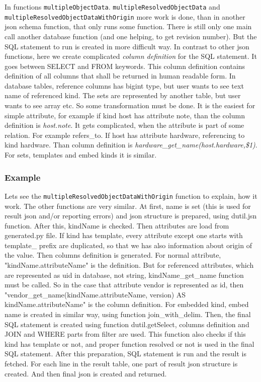 \documentclass[deska]{subfiles}
\begin{document}
In functions {\tt multipleObjectData}. {\tt multipleResolvedObjectData} and {\tt multipleResolvedObjectDataWithOrigin}
more work is done, than in another json schema function, that only runs some function.
There is still only one main call another database function (and one helping, to get revision number).
But the SQL statement to run is created in more difficult way. In contrast to other json functions,
here we create complicated {\em column definition} for the SQL statement. It goes between SELECT and FROM keywords.
This column definition contains definition of all columns that shall be returned in human readable form.
In database tables, reference columns has bigint type, but user wants to see text name of referenced kind.
The sets are represented by another table, but user wants to see array etc. So some transformation must be done.
It is the easiest for simple attribute,
for example if kind host has attribute note, than the column definition is {\em host.note}.
It gets complicated, when the attribute is part of some relation. For example refers\_to.
If host has attribute hardware, referencing to kind hardware. Than column definition is 
{\em hardware\_get\_name(host.hardware,\$1)}. For sets, templates and embed kinds it is similar.

\subsubsection{Example}
Lets see the {\tt multipleResolvedObjectDataWithOrigin} function to explain, how it work. The other functions are very similar.
At first, name is set (this is used for result json and/or reporting errors) and json structure is prepared,
using dutil.jsn function. After this, kindName is checked. Then attributes are load from generated.py file.
If kind has template, every attribute except one starts with template\_ prefix are duplicated, so that we has
also information about origin of the value.
Then columns definition is generated. For normal attribute, "kindName.attributeName" is the definition.
But for referenced attributes, which are
represented as uid in database, not string, kindName\_get\_name function must be called. So in the case that attribute vendor is represented as id, then
"vendor\_get\_name(kindName.attributeName, version) AS kindName.attributeName" is the column definition. For embedded kind, embed name is created in similar way,
using function join\_with\_delim.
Then, the final SQL statement is created using function dutil.getSelect, columns definition and JOIN and WHERE parts from filter are used.
This function also checks if this kind has template or not, and proper function resolved or not is used in the final SQL statement.
After this preparation, SQL statement is run and the result is fetched. For each line in the result table, one part of result json structure is
created. And then final json is created and returned.
\end{document}
